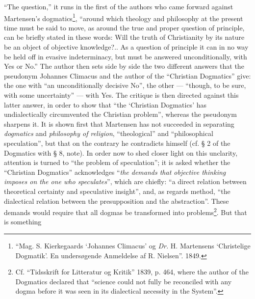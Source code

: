 \documentclass[12pt,a4paper]{book}
\newcommand{\opage}[1]{\marginnote{\footnotesize\textit{[#1]}}}
\begin{document}
``The question,'' it runs in the first of the authors who came forward against Martensen's dogmatics\footnote{``Mag. S. Kierkegaards `Johannes Climacus' og \textit{Dr.} H. Martensens `Christelige Dogmatik'. En undersøgende Anmeldelse af R. Nielsen''. 1849.}, ``around which theology and philosophy at the present time must be said to move, as around the true and proper question of principle, can be briefly stated in these words: Will the truth of Christianity by its nature be an object of objective knowledge?.. As a question of principle it can in no way be held off in evasive indeterminacy, but must be answered unconditionally, with Yes or No.'' The author then sets side by side the two different answers that the pseudonym Johannes Climacus and the author of the ``Christian Dogmatics'' give: the one with ``an unconditionally decisive No'', the other --- ``though, to be sure, with some uncertainty'' --- with Yes. The critique is then directed against this latter answer, in order to show that ``the `Christian Dogmatics' has undialectically circumvented the Christian problem'', whereas the pseudonym sharpens it. It is shown first that Martensen has not succeeded in separating \emph{dogmatics} and \emph{philosophy of religion}, ``theological'' and ``philosophical speculation'', but that on the contrary he contradicts himself (cf. § 2 of the Dogmatics with § 8, note). In order now to shed closer light on this unclarity, attention is turned to ``the problem of speculation''; it is asked whether the ``Christian Dogmatics'' acknowledges ``\emph{the demands that objective thinking imposes on the one who speculates}'', which are chiefly: ``a direct relation between theoretical certainty and speculative insight'', and, as regards method, ``the dialectical relation between the presupposition and the abstraction''. These demands would require that all dogmas be transformed into problems\footnote{%
Cf. ``Tidsskrift for Litteratur og Kritik'' 1839, p. 464, where the author of the Dogmatics declared that ``science could not fully
be reconciled with any dogma before it was seen in its dialectical necessity in the System''.}. But that is something
\opage{27}\setcounter{footnote}{0}%
\end{document}
